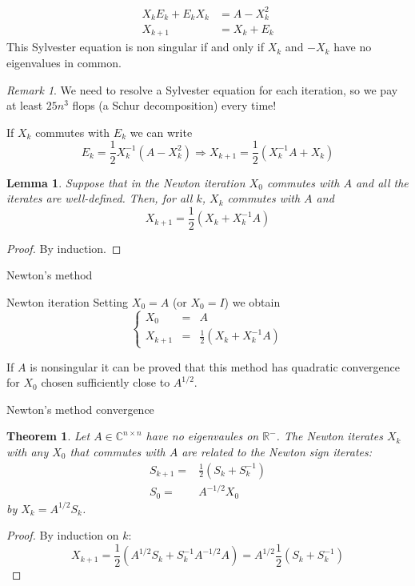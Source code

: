 \documentclass{beamer}
\newcounter{counter1}
\theoremstyle{plain}
\newtheorem{myteo}[counter1]{Theorem}
\newtheorem{mylem}[counter1]{Lemma}
\theoremstyle{definition}
\theoremstyle{remark}
\newtheorem{myoss}[counter1]{Remark}
\newcommand{\pa}[1]{\left(#1\right)}
\begin{document}
\begin{frame}
  \begin{align*}
    X_k E_k + E_k X_k &= A - X_k ^2 \\
    X_{k+1} &= X_k + E_k
  \end{align*}
  This Sylvester equation is non singular if and only if $X_k$ and
  $-X_k$ have no eigenvalues in common.
  \vfill

  \begin{myoss}
    We need to resolve a Sylvester equation for each iteration, so we
    pay at least $25n^3$ flops (a Schur decomposition) every time!
  \end{myoss}
\end{frame}

\begin{frame}
  If $X_k$ commutes with $E_k$ we can write
  \[ E_k = \frac{1}{2} X_k ^{-1} \pa{ A - X_k ^2} \Rightarrow X_{k+1}
    =  \frac{1}{2} \pa{ X_k ^{-1} A + X_k } \]
  \pause
  \begin{mylem}
    Suppose that in the Newton iteration $X_0$ commutes with $A$ and
    all the iterates are well-defined. Then, for all $k$, $X_k$
    commutes with $A$ and
    \[ X_{k+1} = \frac{1}{2} \pa{ X_k + X_k ^{-1} A} \]
  \end{mylem}
  \begin{proof}
    By induction.
  \end{proof}
\end{frame}

\begin{frame}{Newton's method}
  \begin{block}{Newton iteration}
    Setting $X_0 = A$ (or $X_0 = I$) we obtain
    \[ \left\{
        \begin{matrix}
          X_0 &=& A \\
          X_{k+1} &=& \frac{1}{2} \pa{ X_k + X_k ^{-1} A}
        \end{matrix} \right.
    \]
  \end{block}

  If $A$ is nonsingular it can be proved that this method has
  quadratic convergence for $X_0$ chosen sufficiently close to
  $A^{1/2}$.
\end{frame}

\begin{frame}{Newton's method convergence}
  \begin{myteo}
    Let $A \in \mathbb{C}^{n\times n}$ have no eigenvaules on
    $\mathbb{R}^-$. The Newton iterates $X_k$ with any $X_0$ that
    commutes with $A$ are related to the Newton sign iterates:
    \begin{align*}
      S_{k+1} = & \frac{1}{2} \pa{ S_k + S_k^{-1}} \\
      S_0 = & A^{-1/2} X_0 
    \end{align*}
    by $X_k = A^{1/2} S_k$.
  \end{myteo}
  \begin{proof}
    By induction on $k$:
    \[ X_{k+1} = \frac{1}{2}\pa{A^{1/2}S_k + S_k^{-1}A^{-1/2}A} =
        A^{1/2}\frac{1}{2}\pa{S_k + S_k ^{-1}} \]
  \end{proof}
\end{frame}
\end{document}

